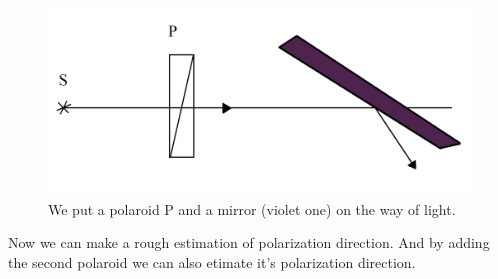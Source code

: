 \begin{minipage}{0.55\textwidth}
    \begin{figure}[h]
    \centering
    \includegraphics[width=1\textwidth]{images/mirror.png}
    \caption{We put a polaroid P and a mirror (violet one) on the way of light.}
\end{figure}
\end{minipage}
\hfill
\begin{minipage}{0.35\textwidth}
	Now we can make a rough estimation of polarization direction. And by adding the second polaroid we can also etimate it's polarization direction.
\end{minipage}

